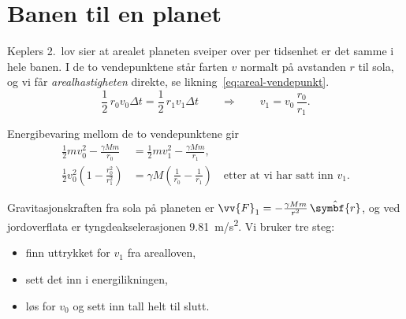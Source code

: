 \documentclass[a4paper,11pt]{article}
\begin{document}
\section{Banen til en planet}

Keplers 2.\ lov sier at arealet planeten sveiper over per tidsenhet er det samme i hele banen. I de to vendepunktene står farten $v$ normalt på avstanden $r$ til sola, og vi får \emph{arealhastigheten} direkte, se likning~\eqref{eq:areal-vendepunkt}.
\begin{equation}
    \frac{1}{2}\, r_0 v_0 \Delta t = \frac{1}{2}\, r_1 v_1 \Delta t
    \qquad\Longrightarrow\qquad
    v_1 = v_0\,\frac{r_0}{r_1} .
    \label{eq:areal-vendepunkt}
\end{equation}

Energibevaring mellom de to vendepunktene gir
\begin{align*}
    \frac{1}{2} m v_0^2 - \frac{\gamma M m}{r_0} &= \frac{1}{2} m v_1^2 - \frac{\gamma M m}{r_1} , \\
    \frac{1}{2} v_0^2 \left(1 - \frac{r_0^2}{r_1^2}\right) &= \gamma M \left(\frac{1}{r_0} - \frac{1}{r_1}\right) \quad \text{etter at vi har satt inn $v_1$.}
\end{align*}

Gravitasjonskraften fra sola på planeten er $\vv{F}_1 = -\frac{\gamma M m}{r^2}\,\hat{\symbf{r}}$, og ved jordoverflata er tyngdeakselerasjonen \qty{9,81}{m/s^2}. Vi bruker tre steg:
\begin{itemize}
    \item finn uttrykket for $v_1$ fra arealloven,
    \item sett det inn i energilikningen,
    \item løs for $v_0$ og sett inn tall helt til slutt.
\end{itemize}
\end{document}
